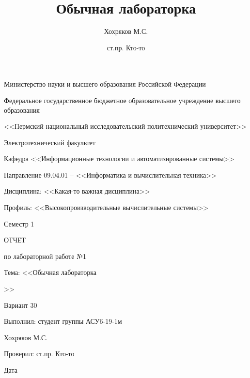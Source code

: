 \begin{titlepage}
\newcommand{\ctitle}[1]{#1\title{#1}}
\newcommand{\cauthor}[1]{#1\author{#1}}
\singlespacing

\begin{center}
	\small
	Министерство науки и высшего образования Российской Федерации\par
    Федеральное государственное бюджетное образовательное учреждение
    высшего образования\par
	<<Пермский национальный исследовательский политехнический университет>>\par
	Электротехнический факультет\par
	Кафедра <<Информационные технологии и автоматизированные системы>>\par
	Направление 09.04.01 -- <<Информатика и вычислительная техника>>\par
\end{center}

\vspace{2em}
\setlength{\parskip}{0.4em}

\begin{center}
	Дисциплина: <<Какая-то важная дисциплина>>\par
	Профиль: <<Высокопроизводительные вычислительные системы>>\par
	Семестр 1
\end{center}

\vspace{2em}

\begin{center}
	ОТЧЕТ\par
	по лабораторной работе №1\par
	Тема: <<\ctitle{Обычная лабораторка}>>\par
	Вариант 30
\end{center}

\vspace{2em}

\begin{center}
    \hfill
    \begin{minipage}{0.55\textwidth}
        \setlength{\parskip}{0.4em}

        Выполнил: студент группы АСУ6-19-1м\par
        \cauthor{Хохряков М.С.}\underline{\hspace{0.3\textwidth}}\par
        Проверил: \cauthor{ст.пр. Кто-то}\underline{\hspace{0.3\textwidth}}\par
        Дата \underline{\hspace{0.3\textwidth}}\par
    \end{minipage}
\end{center}

\vspace{\fill}

\end{titlepage}
